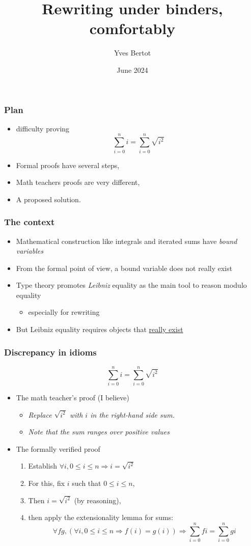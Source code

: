 \documentclass[compress]{beamer}
\title{Rewriting under binders, comfortably}
\author{Yves Bertot}
\date{June 2024}
\begin{document}
\maketitle
\begin{frame}
\frametitle{Plan}
\begin{itemize}
\item difficulty proving \[\sum_{i = 0}^{n} i = \sum_{i = 0}^{n} \sqrt{i^2}\]
\item Formal proofs have several steps, 
\item Math teachers proofs are very different,
\item A proposed solution.
\end{itemize}
\end{frame}
\begin{frame}
\frametitle{The context}
\begin{itemize}
\item Mathematical construction like integrals and iterated sums have
{\em bound variables}
\item From the formal point of view, a bound variable does not really exist
\item Type theory promotes {\em Leibniz} equality as the main tool
to reason modulo equality
\begin{itemize}
\item especially for rewriting
\end{itemize}
\item But Leibniz equality requires objects that \underline{really exist}
\end{itemize}
\end{frame}
\begin{frame}
\frametitle{Discrepancy in idioms}
\[\sum_{i = 0}^{n} i = \sum_{i = 0}^{n} \sqrt{i ^ 2}\]
\begin{itemize}
\item The math teacher's proof (I believe)
\begin{itemize}
\item {\em Replace \(\sqrt{i^2}\) with \(i\) in the right-hand side sum.}
\item {\em Note that the sum ranges over positive values}
\end{itemize}
\item The formally verified proof
\begin{enumerate}
\item Establish \(\forall i, 0 \leq i \leq n \Rightarrow i = \sqrt{i ^ 2}\)
\item For this, fix \(i\) such that \(0 \leq i \leq n\),
\item Then \(i = \sqrt{i ^ 2}\) (by reasoning),
\item then apply the extensionality lemma for sums:
\[\forall f g, (\forall i, 0 \leq i \leq n \Rightarrow f(i) = g(i)) \Rightarrow
\sum_{i = 0}^{n} f i = \sum_{i = 0}^{n} g i\]
\end{enumerate}
\end{itemize}
\end{frame}
\end{document}
